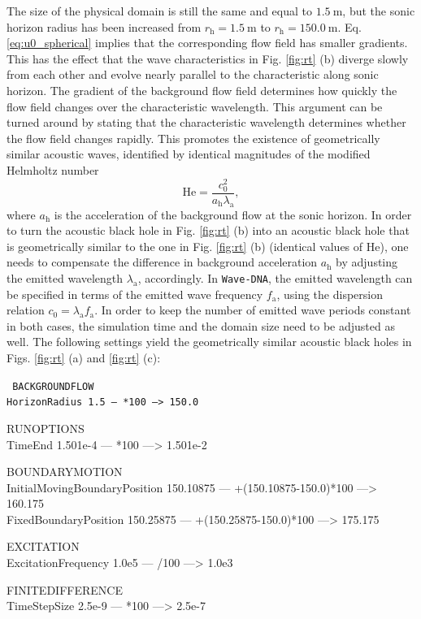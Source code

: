 The size of the physical domain is still the same and equal to $1.5\:\mathrm{m}$, but the sonic horizon radius has been increased from $r_{\mathrm{h}}=1.5\:\mathrm{m}$ to $r_{\mathrm{h}}=150.0\:\mathrm{m}$. Eq. \eqref{eq:u0_spherical} implies that the corresponding flow field has smaller gradients. This has the effect that the wave characteristics in Fig. \ref{fig:rt} (b) diverge slowly from each other and evolve nearly parallel to the characteristic along sonic horizon. The gradient of the background flow field determines how quickly the flow field changes over the characteristic wavelength. This argument can be turned around by stating that the characteristic wavelength determines whether the flow field changes rapidly. This promotes the existence of geometrically similar acoustic waves, identified by identical magnitudes of the modified Helmholtz number
\begin{equation}
\mathrm{He} = \dfrac{c_0^2}{a_{\mathrm{h}}\lambda_{\mathrm{a}}},
\label{eq:Helmholtz}    
\end{equation}
where $a_{\mathrm{h}}$ is the acceleration of the background flow at the sonic horizon. In order to turn the acoustic black hole in Fig. \ref{fig:rt} (b) into an acoustic black hole that is geometrically similar to the one in Fig. \ref{fig:rt} (b) (identical values of $\mathrm{He}$), one needs to compensate the difference in background acceleration $a_{\mathrm{h}}$ by adjusting the emitted wavelength $\lambda_{\mathrm{a}}$, accordingly. In {\tt Wave-DNA}, the emitted wavelength can be specified in terms of the emitted wave frequency $f_{\mathrm{a}}$, using the dispersion relation $c_0=\lambda_{\mathrm{a}}f_{\mathrm{a}}$. In order to keep the number of emitted wave periods constant in both cases, the simulation time and the domain size need to be adjusted as well. The following settings yield the geometrically similar acoustic black holes in Figs. \ref{fig:rt} (a) and \ref{fig:rt} (c):

{\tt
BACKGROUNDFLOW \\
HorizonRadius 1.5 --- *100 ---> 150.0

RUNOPTIONS \\
TimeEnd 1.501e-4 --- *100 ---> 1.501e-2

BOUNDARYMOTION \\
InitialMovingBoundaryPosition 150.10875 --- +(150.10875-150.0)*100 ---> 160.175 \\
FixedBoundaryPosition 150.25875 --- +(150.25875-150.0)*100 ---> 175.175

EXCITATION \\
ExcitationFrequency 1.0e5 --- /100 ---> 1.0e3

FINITEDIFFERENCE \\
TimeStepSize 2.5e-9 --- *100 ---> 2.5e-7
}

